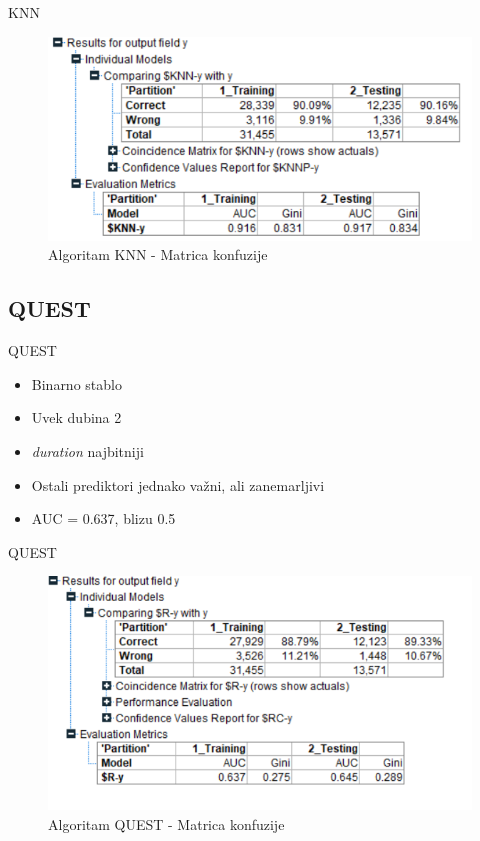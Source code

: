 \documentclass{beamer}
\begin{document}
\begin{frame}{KNN}
    \begin{figure}[h!]
                \begin{center}
                \includegraphics[scale=0.60]{knn_matrix.png}
                \end{center}
                \caption{Algoritam KNN - Matrica konfuzije}
             \end{figure}
\end{frame}

\subsection{QUEST}
\begin{frame}{QUEST}
    \begin{itemize}
        \item Binarno stablo
        \item Uvek dubina 2
        \item \textit{duration} najbitniji 
        \item Ostali prediktori jednako važni, ali zanemarljivi
        \item AUC = 0.637, blizu 0.5
    \end{itemize}
\end{frame}

\begin{frame}{QUEST}
    \begin{figure}[h!]
                \begin{center}
                \includegraphics[scale=0.60]{quest_matrix.png}
                \end{center}
                \caption{Algoritam QUEST - Matrica konfuzije}
     \end{figure}
\end{frame}
\end{document}
